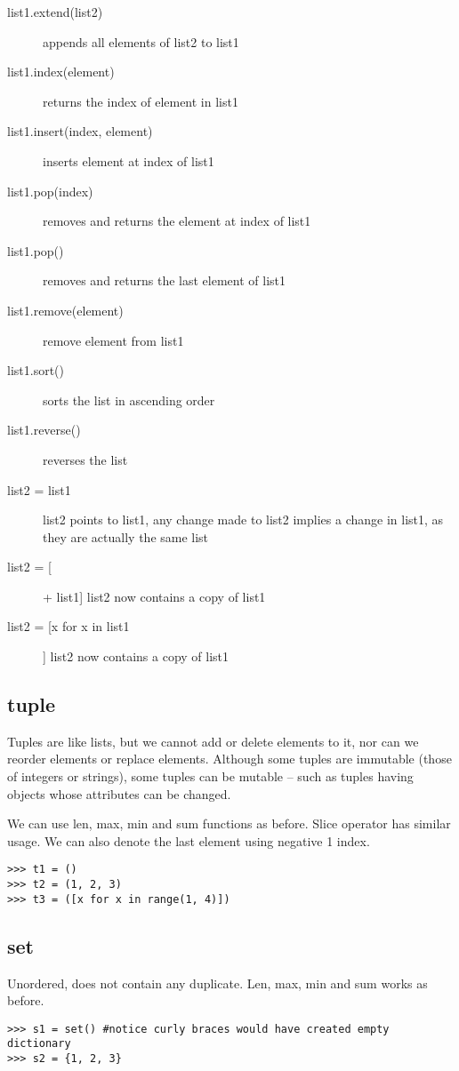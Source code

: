 \documentclass[a4paper, 12pt]{article}
\begin{document}
\begin{description}
\item[list1.extend(list2)] appends all elements of list2 to list1
\item[list1.index(element)] returns the index of element in list1
\item[list1.insert(index, element)] inserts element at index of list1
\item[list1.pop(index)] removes and returns the element at index of list1
\item[list1.pop()] removes and returns the last element of list1
\item[list1.remove(element)] remove element from list1
\item[list1.sort()] sorts the list in ascending order
\item[list1.reverse()] reverses the list
\item[list2 = list1] list2 points to list1, any change made to list2 implies a change in list1, as they are actually the same list
\item[list2 = [] + list1] list2 now contains a copy of list1
\item[list2 = [x for x in list1]] list2 now contains a copy of list1
\end{description}

\subsection{tuple}
Tuples are like lists, but we cannot add or delete elements to it, nor can we reorder elements or replace elements. Although some tuples are immutable (those of integers or strings), some tuples can be mutable -- such as tuples having objects whose attributes can be changed.

We can use len, max, min and sum functions as before. Slice operator has similar usage. We can also denote the last element using negative 1 index.
\begin{verbatim}
>>> t1 = ()
>>> t2 = (1, 2, 3)
>>> t3 = ([x for x in range(1, 4)])
\end{verbatim}

\subsection{set}
Unordered, does not contain any duplicate. Len, max, min and sum works as before.

\begin{verbatim}
>>> s1 = set() #notice curly braces would have created empty dictionary
>>> s2 = {1, 2, 3}
\end{verbatim}
\end{document}

